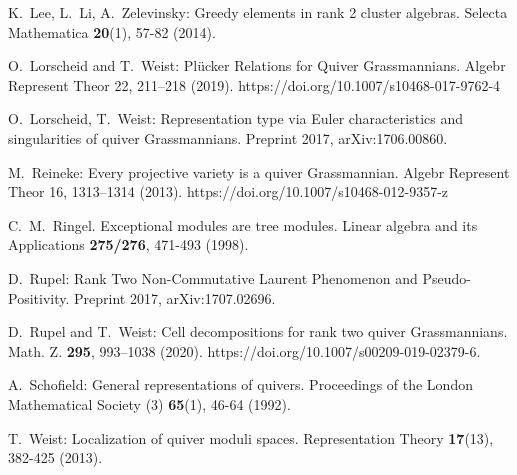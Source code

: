 \documentclass{amsart}
\numberwithin{equation}{section}
\begin{document}
\begin{thebibliography}{10}
  K.~Lee, L.~Li, A.~Zelevinsky: Greedy elements in rank 2 cluster algebras. Selecta Mathematica \textbf{20}(1), 57-82 (2014).

  O.~Lorscheid and T.~Weist: Plücker Relations for Quiver Grassmannians. Algebr Represent Theor 22, 211–218 (2019). https://doi.org/10.1007/s10468-017-9762-4

  O.~Lorscheid, T.~Weist: Representation type via Euler characteristics and singularities of quiver Grassmannians. Preprint 2017, arXiv:1706.00860.

  M.~Reineke: Every projective variety is a quiver Grassmannian. Algebr Represent Theor 16, 1313–1314 (2013). https://doi.org/10.1007/s10468-012-9357-z

  C.~M.~Ringel. Exceptional modules are tree modules. Linear algebra and its Applications \textbf{275/276}, 471-493 (1998).

  D.~Rupel: Rank Two Non-Commutative Laurent Phenomenon and Pseudo-Positivity. Preprint 2017, arXiv:1707.02696.

  D.~Rupel and T.~Weist: Cell decompositions for rank two quiver Grassmannians.  Math. Z. \textbf{295}, 993–1038 (2020). https://doi.org/10.1007/s00209-019-02379-6.

  A.~Schofield: General representations of quivers. Proceedings of the London Mathematical Society (3) \textbf{65}(1), 46-64 (1992).

  T.~Weist: Localization of quiver moduli spaces. Representation Theory \textbf{17}(13), 382-425 (2013).

\end{thebibliography}
\end{document}
